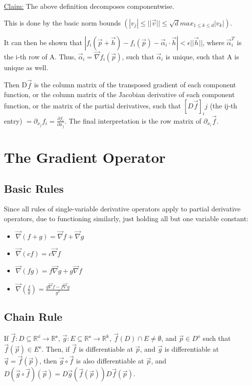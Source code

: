 \documentclass[11 pt, twoside]{article}
\begin{document}
\underline{Claim:} The above definition decomposes componentwise.

This is done by the basic norm bounds $(|v_j| \leq ||\vec{v}|| \leq \sqrt{d}max_{1 \leq k \leq d} |v_k|)$.

It can then be shown that $|f_i(\vec{p} + \vec{h}) - f_i(\vec{p}) - \vec{\alpha}_i \cdot \vec{h}| < \epsilon||\vec{h}||$, where $\vec{\alpha}_i^T$ is the i-th row of A. Thus, $\vec{\alpha}_i = \vec{\nabla}f_i(\vec{p})$, such that $\vec{\alpha}_i$ is unique, such that A is unique as well.

Then D$\vec{f}$ is the column matrix of the transposed gradient of each component function, or the column matrix of the Jacobian derivative of each component function, or the matrix of the partial derivatives, such that $[D\vec{f}]_ij$ (the ij-th entry) $= \partial_{x_j}f_i = \frac{\partial f_i}{\partial x_j}$. The final interpretation is the row matrix of $\partial_{x_i}\vec{f}$.

\section{The Gradient Operator}

\subsection{Basic Rules}

Since all rules of single-variable derivative operators apply to partial derivative operators, due to functioning similarly, just holding all but one variable constant:

\begin{itemize}
\item $\vec{\nabla}(f + g) = \vec{\nabla}f + \vec{\nabla}g$
\item $\vec{\nabla}(cf) = c\vec{\nabla}f$
\item $\vec{\nabla}(fg) = f\vec{\nabla}g + g\vec{\nabla}f$
\item $\vec{\nabla}(\frac{f}{g}) = \frac{g\vec{\nabla}f - f\vec{\nabla}g}{g^2}$
\end{itemize}

\subsection{Chain Rule}

If $\vec{f}: D \subseteq \mathbb{R^d} \to \mathbb{R^e}$, $\vec{g}: E \subseteq \mathbb{R^e} \to \mathbb{R^k}$, $\vec{f}(D) \cap E \neq \emptyset$, and $\vec{p} \in D^o$ such that $\vec{f}(\vec{p}) \in E^o$. Then, if $\vec{f}$ is differentiable at $\vec{p}$, and $\vec{g}$ is differentiable at $\vec{q} = \vec{f}(\vec{p})$, then $\vec{g} \circ \vec{f}$ is also differentiable at $\vec{p}$, and $D(\vec{g} \circ \vec{f})(\vec{p}) = D\vec{g}(\vec{f}(\vec{p}))D\vec{f}(\vec{p})$.
\end{document}
